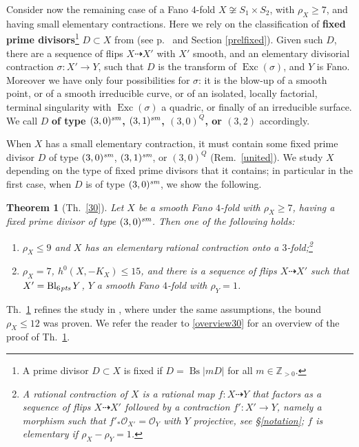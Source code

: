 \documentclass[a4paper,12pt]{amsart}
\newtheorem{thm}{Theorem}[section]
\theoremstyle{definition}
\numberwithin{figure}{section}
\numberwithin{table}{section}
\newcommand{\ol}{\mathcal{O}}
\newcommand{\Z}{\mathbb{Z}}
\newcommand{\Exc}{\operatorname{Exc}}
\newcommand{\Bs}{\operatorname{Bs}}
\newcommand{\Bl}{\operatorname{Bl}}
\newcommand{\sm}{\text{\it sm}}
\newcommand{\pts}{\text{\it pts}}
\begin{document}
Consider now the remaining case of a Fano $4$-fold $X\not\cong S_1\times S_2$,   with $\rho_X\geq 7$, and having small elementary contractions.
Here we rely on the classification of {\bf fixed prime divisors}\footnote{A  prime divisor $D\subset X$ is fixed if  $D=\Bs|mD|$ for all $m\in\Z_{>0}$.} $D\subset X$ from \cite{eff} (see p.~\pageref{fixedprime} and Section \ref{prelfixed}). Given such $D$,
 there
 are a sequence of flips $X\dasharrow X'$ with $X'$ smooth, and an elementary divisorial contraction $\sigma\colon X'\to Y$, such that
$D$ is the transform of $\Exc(\sigma)$, and $Y$ is Fano. Moreover we have only four possibilities for $\sigma$: it is 
 the blow-up of a smooth point, or of a smooth irreducible curve, or
of
an isolated, locally factorial, terminal singularity with
$\Exc(\sigma)$ a quadric, or finally of an irreducible surface.
We call $D$ {\bf of type $(3,0)^{\sm}$, $(3,1)^{\sm}$, $(3,0)^Q$, or $(3,2)$} accordingly.

When $X$ has a small elementary contraction, it must contain some fixed prime divisor $D$ of type $(3,0)^{\sm}$, $(3,1)^{\sm}$, or $(3,0)^Q$ (Rem.~\ref{united}). 
We study $X$ depending on the type of fixed prime divisors that it contains; in particular in the first case, when $D$ is of type $(3,0)^{\sm}$, we show the following.
\begin{thm}[Th.~\ref{30}]\label{30intro}
Let $X$ be a smooth Fano $4$-fold with $\rho_X\geq 7$, having a fixed prime divisor of type $(3,0)^{\sm}$. Then  one of the following holds:
  \begin{enumerate}[$(i)$]
  \item $\rho_X\leq 9$ and $X$ has an elementary rational contraction onto a $3$-fold;\footnote{A \emph{rational contraction} of $X$ is a rational map $f\colon X\dasharrow Y$ that factors as a sequence of flips $X\dasharrow X'$ followed by a contraction  $f'\colon X'\to Y$, namely a morphism such that $f'_*\ol_{X'}=\ol_Y$ with $Y$ projective,
 see \S\ref{notation}; $f$ is \emph{elementary} if $\rho_X-\rho_Y=1$.}
  \item $\rho_X=7$,
$h^0(X,-K_X)\leq 15$,
and there is a sequence of flips $X\dasharrow X'$ such that $X'=\Bl_{6\mskip1mu\pts}Y$, $Y$ a smooth Fano $4$-fold with $\rho_Y=1$.
    \end{enumerate}
\end{thm}
Th.~\ref{30intro} refines the study in \cite{blowup}, where under the same assumptions, the bound $\rho_X\leq 12$ was proven. We refer the reader to \ref{overview30} for an overview of the proof of Th.~\ref{30intro}.
\end{document}
